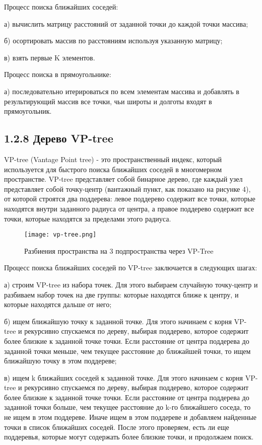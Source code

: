 Процесс поиска ближайших соседей:
\par а) вычислить матрицу расстояний от заданной точки до каждой точки массива;
\par б) осортировать массив по расстояниям используя указанную матрицу;
\par в) взять первые K элементов.

Процесс поиска в прямоугольнике:
\par а) последовательно итерироваться по всем элементам массива и добавлять в результирующий массив все точки, чьи широты и долготы входят в прямоугольник.


\subsection{1.2.8 Дерево VP-tree}
VP-tree (Vantage Point tree) - это пространственный индекс, который используется для быстрого поиска ближайших соседей в многомерном пространстве. VP-tree представляет собой бинарное дерево, где каждый узел представляет собой точку-центр (вантажный пункт, как показано на рисунке 4), от которой строятся два поддерева: левое поддерево содержит все точки, которые находятся внутри заданного радиуса от центра, а правое поддерево содержит все точки, которые находятся за пределами этого радиуса.
\par\vspace{1em}
\begin{figure}[H]
    \centering
    \texttt{[image: vp-tree.png]}
    \caption{Разбиения пространства на 3 подпространства через VP-Tree}
\end{figure}
  
Процесс поиска ближайших соседей по VP-tree заключается в следующих шагах:
\par а) строим VP-tree из набора точек. Для этого выбираем случайную точку-центр и разбиваем набор точек на две группы: которые находятся ближе к центру, и которые находятся дальше от него;
\par б) ищем ближайшую точку к заданной точке. Для этого начинаем с корня VP-tree и рекурсивно спускаемся по дереву, выбирая поддерево, которое содержит более близкие к заданной точке точки. Если расстояние от центра поддерева до заданной точки меньше, чем текущее расстояние до ближайшей точки, то ищем ближайшую точку в этом поддереве;
\par в) ищем k ближайших соседей к заданной точке. Для этого начинаем с корня VP-tree и рекурсивно спускаемся по дереву, выбирая поддерево, которое содержит более близкие к заданной точке точки. Если расстояние от центра поддерева до заданной точки больше, чем текущее расстояние до k-го ближайшего соседа, то не ищем в этом поддереве. Иначе ищем в этом поддереве и добавляем найденные точки в список ближайших соседей. После этого проверяем, есть ли еще поддеревья, которые могут содержать более близкие точки, и продолжаем поиск.



